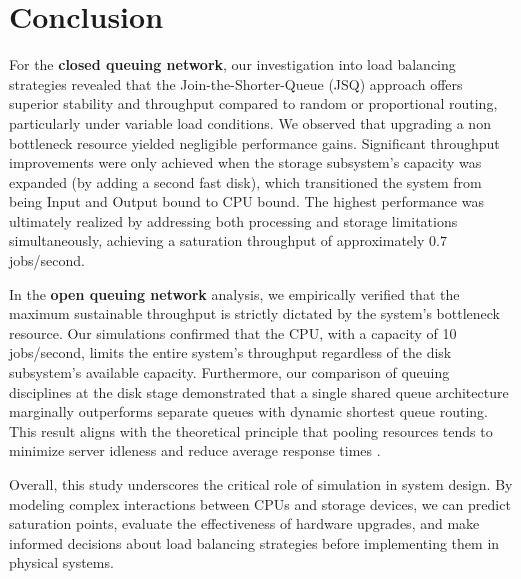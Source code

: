 \documentclass[a4paper,10pt]{article}
\begin{document}
\section{Conclusion}
For the \textbf{closed queuing network}, our investigation into load balancing strategies revealed that the Join-the-Shorter-Queue (JSQ) approach offers superior stability and throughput compared to random or proportional routing, particularly under variable load conditions. We observed that upgrading a non bottleneck resource yielded negligible performance gains. Significant throughput improvements were only achieved when the storage subsystem's capacity was expanded (by adding a second fast disk), which transitioned the system from being Input and Output bound to CPU bound. The highest performance was ultimately realized by addressing both processing and storage limitations simultaneously, achieving a saturation throughput of approximately $0.7$ jobs/second.

In the \textbf{open queuing network} analysis, we empirically verified that the maximum sustainable throughput is strictly dictated by the system's bottleneck resource. Our simulations confirmed that the CPU, with a capacity of 10 jobs/second, limits the entire system's throughput regardless of the disk subsystem's available capacity. Furthermore, our comparison of queuing disciplines at the disk stage demonstrated that a single shared queue architecture marginally outperforms separate queues with dynamic shortest queue routing. This result aligns with the theoretical principle that pooling resources tends to minimize server idleness and reduce average response times \cite{AdanWeiss2017}.

Overall, this study underscores the critical role of simulation in system design. By modeling complex interactions between CPUs and storage devices, we can predict saturation points, evaluate the effectiveness of hardware upgrades, and make informed decisions about load balancing strategies before implementing them in physical systems.
\printbibliography
\end{document}
